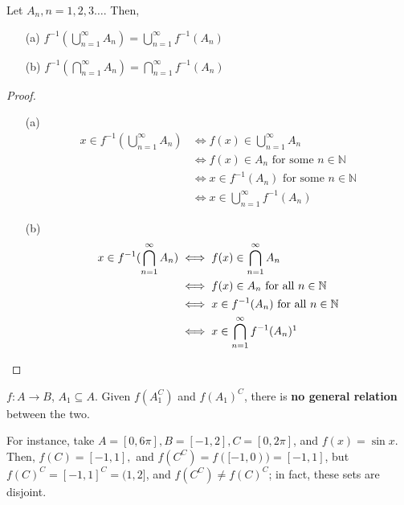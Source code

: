 \documentclass[12pt]{article}
\begin{document}
\begin{proposition}[$\textcolor{red}{\star}$]
  Let $A_n, n = 1,2,3 \dots$. Then, 
  \begin{itemize}
    \item[(a)] $f^{-1}(\bigcup_{n=1}^{\infty}A_n) = \bigcup_{n=1}^{\infty}f^{-1}(A_n)$
    \item[(b)] $f^{-1}(\bigcap_{n=1}^{\infty}A_n) = \bigcap_{n=1}^{\infty}f^{-1}(A_n)$
  \end{itemize}
\end{proposition}

\begin{proof}\footnotemark
  \begin{itemize}
    \item[(a)]
  \begin{align*}
    x \in f^{-1}(\bigcup_{n=1}^{\infty}A_n) &\iff f(x) \in \bigcup_{n=1}^\infty A_n\\
    & \iff f(x) \in A_n \text{ for some } n \in \mathbb{N}\\
    & \iff x \in f^{-1}(A_n) \text{ for some } n \in \mathbb{N}\\
    & \iff x \in \bigcup_{n=1}^\infty f^{-1}(A_n)
  \end{align*}
  \item[(b)]
  \begin{align*}
    x \in f^{-1}(\bigcap_{n=1}^{\infty}A_n) &\iff f(x) \in \bigcap_{n=1}^\infty A_n\\
    &\iff f(x) \in A_n \text{ for all } n \in \mathbb{N}\\
    &\iff x \in f^{-1}(A_n) \text{ for all } n \in \mathbb{N}\\
    &\iff x \in \bigcap_{n=1}^\infty f^{-1}(A_n)\footnotemark
  \end{align*}
  \end{itemize}
\end{proof}

\begin{remark}
  $f: A \to B$, $A_1 \subseteq A$. Given $f(A_1^C)$ and $f(A_1)^C$, there is \textbf{no general relation} between the two.

  For instance, take $A = [0, 6 \pi], B = [-1, 2], C = [0, 2 \pi]$, and $f(x) = \sin x$. Then, $f(C) = [-1,1],$ and $f(C^C) = f([-1,0)) = [-1,1]$, but $f(C)^C = [-1,1]^C = (1,2]$, and $f(C^C) \neq f(C)^C$; in fact, these sets are disjoint.
\end{remark}
\end{document}
